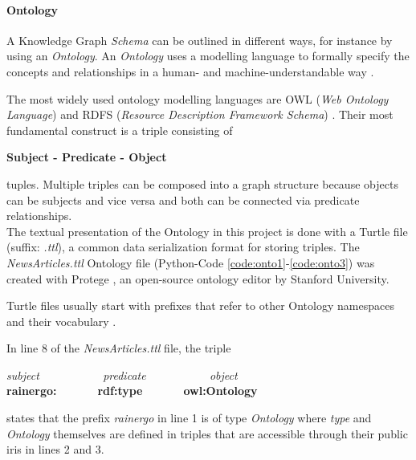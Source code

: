 \paragraph{Ontology}
A Knowledge Graph \emph{Schema} can be outlined in different ways, for instance by using an \emph{Ontology}.
An \emph{Ontology} uses a modelling language to formally specify the concepts and relationships in a human- and machine-understandable way \cite{neo4j-kgdefinition}.

The most widely used ontology modelling languages are OWL (\emph{Web Ontology Language}) \cite{owl} and RDFS (\emph{Resource Description Framework Schema}) \cite{rdfs}.
Their most fundamental construct is a triple \cite{triples} consisting of
\begin{center}
\textbf{Subject - Predicate - Object}
\end{center}
tuples.
Multiple triples can be composed into a graph structure because objects can be subjects and vice versa and both can be connected via predicate relationships.\\
The textual presentation of the Ontology in this project is done with a Turtle \cite{turtle} file (suffix: \emph{.ttl}), a common data serialization format for storing triples.
The \emph{NewsArticles.ttl} Ontology file (Python-Code \ref{code:onto1}-\ref{code:onto3}) was created with Protege \cite{protege}, an open-source ontology editor by Stanford University.


Turtle files usually start with prefixes that refer to other Ontology namespaces \cite{owl-guide} and their vocabulary \cite{owl-guide}.

In line 8 of the \emph{NewsArticles.ttl} file, the triple
\begin{center}
    \emph{subject}  ~~~~~~~~~~    \emph{predicate}  ~~~~~~~~~~  \emph{object}\\
    \textbf{rainergo: ~~~~~ rdf:type ~~~~~ owl:Ontology}
\end{center}
states that the prefix \emph{rainergo} in line 1 is of type \emph{Ontology} where \emph{type} and \emph{Ontology} themselves
are defined in triples that are accessible through their public \glspl{iri} in lines 2 and 3.

